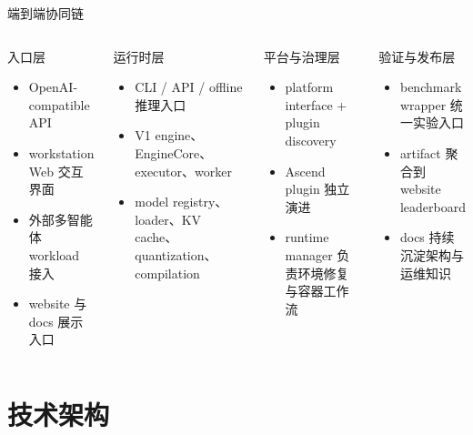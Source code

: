 \documentclass[aspectratio=169,11pt,fontset=none]{ctexbeamer}
\begin{document}
\begin{frame}{端到端协同链}
  \begin{columns}[T]
    \begin{block}{入口层}
      \begin{itemize}
        \item OpenAI-compatible API
        \item workstation Web 交互界面
        \item 外部多智能体 workload 接入
        \item website 与 docs 展示入口
      \end{itemize}
    \end{block}

    \begin{block}{运行时层}
      \begin{itemize}
        \item CLI / API / offline 推理入口
        \item V1 engine、EngineCore、executor、worker
        \item model registry、loader、KV cache、quantization、compilation
      \end{itemize}
    \end{block}

    \begin{block}{平台与治理层}
      \begin{itemize}
        \item platform interface + plugin discovery
        \item Ascend plugin 独立演进
        \item runtime manager 负责环境修复与容器工作流
      \end{itemize}
    \end{block}

    \begin{block}{验证与发布层}
      \begin{itemize}
        \item benchmark wrapper 统一实验入口
        \item artifact 聚合到 website leaderboard
        \item docs 持续沉淀架构与运维知识
      \end{itemize}
    \end{block}
  \end{columns}
\end{frame}

\section{技术架构}
\end{document}

